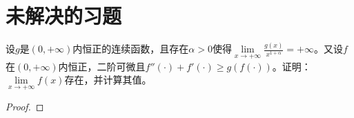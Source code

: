 \documentclass[../../main.tex]{subfiles}
\begin{document}
\section{未解决的习题}

\begin{example}
设$g$是$(0,+\infty)$内恒正的连续函数，且存在$\alpha>0$使得$\lim\limits_{x \to +\infty} \frac{g(x)}{x^{1+\alpha}} = +\infty$。又设$f$在$(0,+\infty)$内恒正，二阶可微且$f''(\cdot) + f'(\cdot) \geqslant g(f(\cdot))$。证明：$\lim\limits_{x \to +\infty} f(x)$存在，并计算其值。
\end{example}
\begin{proof}

\end{proof}
\end{document}
